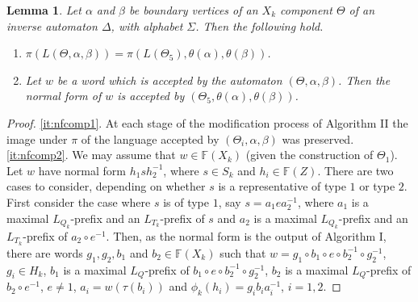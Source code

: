 \documentclass[a4paper,12pt]{article}
\renewcommand{\a}{\alpha }
\renewcommand{\b}{\beta }
\newcommand{\D}{\Delta }
\newcommand{\T}{\Theta }
\renewcommand{\S}{\Sigma }
\renewcommand{\t}{\tau }
\newtheorem{lemma}[theorem]{Lemma}
\numberwithin{equation}{section}
\numberwithin{figure}{section}
\newcommand{\FF}{\ensuremath{\mathbb{F}}}
\newcommand{\be}{\begin{enumerate}}
\newcommand{\ee}{\end{enumerate}}
\begin{document}
\begin{lemma}\label{lem:nfcomp}
Let $\a$ and $\b$ be boundary vertices of  an $X_k$ component $\T$ of
an inverse automaton $\D$, with alphabet $\S$. Then the following hold. 
\be
\item\label{it:nfcomp1}
  $\pi(L(\T,\a,\b))=\pi(L(\T_5),\theta(\a),\theta(\b))$.
\item\label{it:nfcomp2} Let $w$ be a word
 which is accepted by the automaton $(\T, \a, \b)$. Then the
normal form of $w$ is accepted by $(\T_5, \theta(\a), \theta(\b))$.
\ee
\end{lemma}
\begin{proof}
\ref{it:nfcomp1}. At each stage of the modification process of Algorithm
II the image under $\pi$ of the language accepted by $(\T_i,\a,\b)$  was
preserved. \\[1em]

\ref{it:nfcomp2}.
We may assume that $w\in \FF(X_k)$ (given the construction of $\T_1$).
Let $w$ have normal form $h_1s h_2^{-1}$, where $s\in S_k$ and $h_i\in \FF(Z)$.
There are two cases to consider, depending on whether $s$ is a
representative of type $1$ or type $2$.
 First consider the case where $s$ is of type $1$, say
 $s= a_1 e a_2^{-1}$, where
$a_1$ is a maximal $L_{Q_k}$-prefix and an $L_{T_k}$-prefix of $s$ and
 $a_2$  is a maximal $L_{Q_k}$-prefix and an $L_{T_k}$-prefix of $a_2\circ e^{-1}$.
 Then, as the normal form is the output of Algorithm I,
 there are words
$g_1, g_2, b_1$ and $b_2\in \FF(X_k)$ such that
$w=g_1\circ b_1\circ e \circ b_2^{-1}\circ g_2^{-1}$,
$g_i\in H_k$, $b_1$ is a maximal $L_Q$-prefix of
$b_1\circ e \circ b_2^{-1}\circ g_2^{-1}$,
$b_2$ is a maximal $L_Q$-prefix of $b_2\circ e^{-1}$, $e\neq 1$,
$a_i=w(\t(b_i))$ and $\phi_k(h_i)=g_ib_ia_i^{-1}$, $i=1,2$.


\end{proof}
\end{document}
